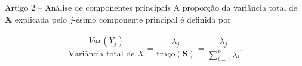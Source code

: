 \documentclass[aspectratio=169]{beamer}
\begin{document}
%	
%    
%    
%    


\begin{frame}{Artigo 2 -- Análise de componentes principais}
    A proporção da variância total de $\boldsymbol{X}$ explicada pelo $j$-ésimo componente principal é definida por
    \begin{block}{}
        \begin{align*}
	        \dfrac{Var(Y_j)}{\textrm{Variância total de } X} = \dfrac{\lambda_j}{\textrm{traço}(\boldsymbol{S})} = \dfrac{\lambda_j}{\displaystyle\sum_{i=1}^{p}\lambda_i}.
        \end{align*}
    \end{block}
\end{frame}
\end{document}
